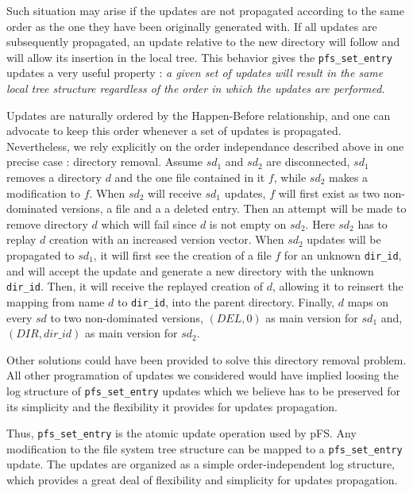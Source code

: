 Such situation may arise if the updates are not propagated according
to the same order as the one they have been originally generated
with. If all updates are subsequently propagated, an update relative
to the new directory will follow and will allow its insertion in the
local tree. This behavior gives the {\tt pfs\_set\_entry} updates a
very useful property : \emph{a given set of updates will result in the
same local tree structure regardless of the order in which the updates
are performed.}

Updates are naturally ordered by the Happen-Before relationship, and
one can advocate to keep this order whenever a set of updates is
propagated. Nevertheless, we rely explicitly on the order independance
described above in one precise case : directory removal. Assume
$sd_{1}$ and $sd_{2}$ are disconnected, $sd_{1}$ removes a
directory $d$ and the one file contained in it $f$, while $sd_{2}$
makes a modification to $f$. When $sd_{2}$ will receive $sd_{1}$
updates, $f$ will first exist as two non-dominated versions, a file
and a a deleted entry. Then an attempt will be made to remove
directory $d$ which will fail since $d$ is not empty on $sd_{2}$. Here
$sd_{2}$ has to replay $d$ creation with an increased version
vector. When $sd_{2}$ updates will be propagated to $sd_{1}$, it will
first see the creation of a file $f$ for an unknown {\tt dir\_id}, and
will accept the update and generate a new directory with the unknown
{\tt dir\_id}. Then, it will receive the replayed creation of $d$,
allowing it to reinsert the mapping from name $d$ to {\tt dir\_id}, into
the parent directory. Finally, $d$ maps on every $sd$ to two non-dominated
versions, $(DEL,0)$ as main version for $sd_{1}$ and, $(DIR, dir\_id)$ as main version
for $sd_{2}$.


Other solutions could have been provided to solve this directory
removal problem. All other programation of updates we considered would
have implied loosing the log structure of {\tt pfs\_set\_entry}
updates which we believe has to be preserved for its simplicity and
the flexibility it provides for updates propagation.

Thus, {\tt pfs\_set\_entry} is the atomic update operation used by
pFS. Any modification to the file system tree structure can be mapped
to a {\tt pfs\_set\_entry} update. The updates are organized as a
simple order-independent log structure, which provides a great deal of
flexibility and simplicity for updates propagation.

